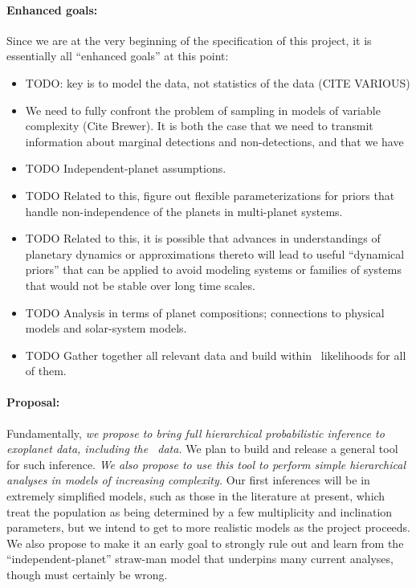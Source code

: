 \documentclass[letterpaper,12pt,preprint]{hack_aastex}
\newcommand{\Bart}{\package{Bart}}
\begin{document}
\paragraph{Enhanced goals:}
Since we are at the very beginning of the specification of this project, it
is essentially all ``enhanced goals'' at this point:
\begin{itemize}
\item
TODO: key is to model the data, not statistics of the data (CITE VARIOUS)
\item
We need to fully confront the problem of sampling in models of
variable complexity (Cite Brewer).  It is both the case that we need
to transmit information about marginal detections and non-detections,
and that we have
\item
TODO Independent-planet assumptions.
\item
TODO Related to this, figure out flexible parameterizations for
priors that handle non-independence of the planets in multi-planet
systems.
\item
TODO Related to this, it is possible that advances in understandings
of planetary dynamics or approximations thereto will lead to useful
``dynamical priors'' that can be applied to avoid modeling systems or
families of systems that would not be stable over long time scales.
\item
TODO Analysis in terms of planet compositions; connections to
physical models and solar-system models.
\item
TODO Gather together all relevant data and build within
\Bart\ likelihoods for all of them.
\end{itemize}


\paragraph{Proposal:}
Fundamentally, \emph{we propose to bring full hierarchical
  probabilistic inference to exoplanet data, including the
  \Kepler\ data.}  We plan to build and release a general tool for
such inference.  \emph{We also propose to use this tool to perform
  simple hierarchical analyses in models of increasing complexity.}
Our first inferences will be in extremely simplified models, such as
those in the literature at present, which treat the population as
being determined by a few multiplicity and inclination parameters, but
we intend to get to more realistic models as the project proceeds.  We
also propose to make it an early goal to strongly rule out and learn
from the ``independent-planet'' straw-man model that underpins many
current analyses, though must certainly be wrong.
\end{document}
